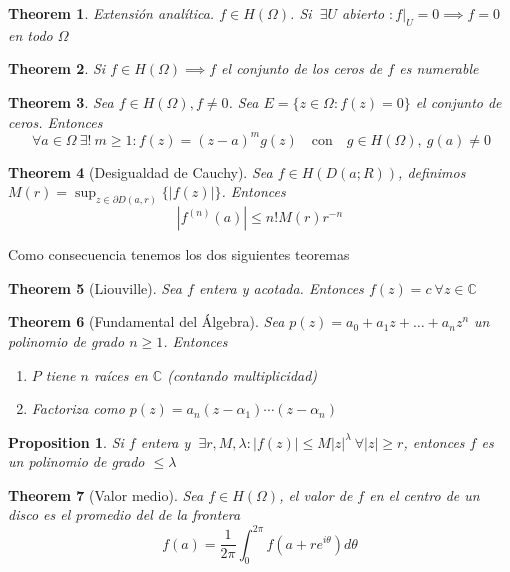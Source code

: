 \documentclass{myclass} \usepackage{verbatim}
\newtheorem*{theorem}{Theorem}
\newtheorem*{proposition}{Proposition}
\begin{document}
\begin{theorem}
Extensión analítica. $f\in H(\Omega)$. Si $\ \exists U$ abierto $: f|_U=0 \implies f=0$ en todo $\Omega$
\end{theorem}

\begin{theorem}
Si $f\in H(\Omega) \implies f$ el conjunto de los ceros de $f$ es numerable
\end{theorem}

\begin{theorem} Sea $f\in H(\Omega), f\neq 0$. Sea $E = \{z\in \Omega : f(z) = 0\}$ el conjunto de ceros. Entonces
  \[
  \ \forall a\in \Omega \ \exists ! \ m\ge 1 : f(z) = (z-a)^mg(z) \quad \text{con} \quad g\in H(\Omega),\ g(a)\neq 0
  \] 

\end{theorem}

\begin{theorem}[Desigualdad de Cauchy]
Sea $f\in H(D(a;R))$, definimos $M(r) = \sup_{z\in \partial D(a, r)} \{|f(z)|\}$. Entonces
\[
|f^{(n)}(a)|\le n! M(r) r^{-n}
\] 
\end{theorem}

Como consecuencia tenemos los dos siguientes teoremas

\begin{theorem}[Liouville]
Sea $f$ entera y acotada. Entonces $f(z) = c \ \forall z\in \mathbb{C}$ 
\end{theorem}

\begin{theorem}[Fundamental del Álgebra]
Sea $p(z) = a_0 + a_1z + \ldots + a_nz^n$ un polinomio de grado $n\ge 1$. Entonces 
\begin{enumerate}[topsep=-6pt, itemsep=0pt]
  \item $P$ tiene  $n$ raíces en  $\mathbb{C}$ (contando multiplicidad) 
  \item Factoriza como  $p(z)= a_n(z-\alpha _1) \cdots (z-\alpha _n)$
\end{enumerate}
\end{theorem}

\begin{proposition}
Si $f$ entera y $\ \exists r, M, \lambda: |f(z)|\le M|z|^\lambda \ \forall |z|\ge r$, entonces $f$ es un polinomio de grado  $\le \lambda$
\end{proposition}

\begin{theorem}[Valor medio]
Sea $f\in H(\Omega)$, el valor de $f$ en el centro de un disco es el promedio del de la frontera
\[
f(a) = \frac{1}{2\pi}\int_0^{2\pi}f(a+ re^{i \theta}) d\theta
\] 
\end{theorem}
\end{document}

